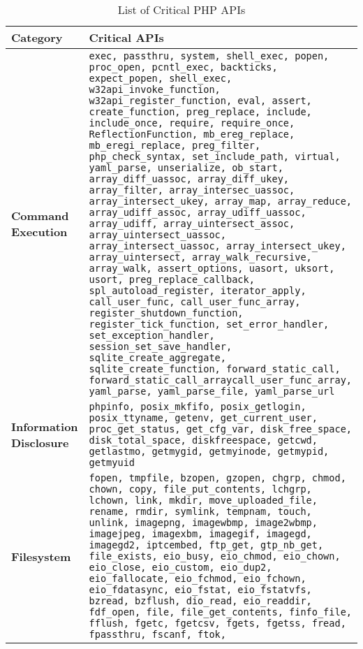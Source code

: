 \begin{table*}[t]
\caption{List of Critical PHP APIs}
\label{tab:cacs}
\begin{adjustbox}{max width=\textwidth}
\begin{tabular}{|l|p{20cm}|}
\hline
    \textbf{Category}               & \textbf{Critical APIs} \\ \hline 
    \textbf{Command Execution} & \texttt{exec, passthru,
    system, shell\_exec, popen, proc\_open, pcntl\_exec, backticks, expect\_popen, shell\_exec, w32api\_invoke\_function, w32api\_register\_function, eval, assert, create\_function, preg\_replace, include, include\_once, require, require\_once, ReflectionFunction, mb\_ereg\_replace, mb\_eregi\_replace, preg\_filter, php\_check\_syntax, set\_include\_path, virtual, yaml\_parse, unserialize, ob\_start, array\_diff\_uassoc, array\_diff\_ukey, array\_filter, array\_intersec\_uassoc, array\_intersect\_ukey, array\_map,
    array\_reduce, array\_udiff\_assoc, array\_udiff\_uassoc, array\_udiff, array\_uintersect\_assoc, array\_uintersect\_uassoc, array\_intersect\_uassoc, array\_intersect\_ukey, array\_uintersect, array\_walk\_recursive, 
    array\_walk, assert\_options, uasort, uksort, usort, preg\_replace\_callback, spl\_autoload\_register, iterator\_apply, call\_user\_func, call\_user\_func\_array, 
    register\_shutdown\_function, register\_tick\_function, set\_error\_handler, set\_exception\_handler, session\_set\_save\_handler, sqlite\_create\_aggregate, sqlite\_create\_function, forward\_static\_call, forward\_static\_call\_arraycall\_user\_func\_array,
    yaml\_parse, yaml\_parse\_file, yaml\_parse\_url}
    \\ \hline
    \textbf{Information Disclosure} & \texttt{phpinfo, posix\_mkfifo, posix\_getlogin, posix\_ttyname, getenv, get\_current\_user, proc\_get\_status, get\_cfg\_var, disk\_free\_space, 
    disk\_total\_space, diskfreespace, getcwd, getlastmo, getmygid, getmyinode, getmypid, getmyuid} \\ \hline 
    \textbf{Filesystem} & \texttt{fopen, tmpfile, bzopen, gzopen, chgrp, chmod, chown, copy, file\_put\_contents, lchgrp, lchown, link, mkdir, move\_uploaded\_file, 
    rename, rmdir, symlink, tempnam, touch, unlink, imagepng, imagewbmp, image2wbmp, imagejpeg, imagexbm, imagegif, imagegd, imagegd2, iptcembed, 
    ftp\_get, gtp\_nb\_get, file\_exists, eio\_busy, eio\_chmod, eio\_chown, eio\_close, eio\_custom, eio\_dup2, eio\_fallocate, eio\_fchmod, eio\_fchown, eio\_fdatasync, eio\_fstat, eio\_fstatvfs,
    bzread, bzflush, dio\_read, eio\_readdir, fdf\_open, file, file\_get\_contents, finfo\_file, fflush, fgetc, fgetcsv, fgets, fgetss, fread, fpassthru, fscanf, ftok,
}
\end{tabular}
\end{adjustbox}
\end{table*}
